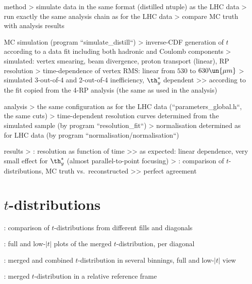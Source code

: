 \> method
\>> simulate data in the same format (distilled ntuple) as the LHC data
\>> run exactly the same analysis chain as for the LHC data
\>> compare MC truth with analysis results

\> MC simulation (program ``simulate\_distill``)
\>> inverse-CDF generation of $t$ according to a data fit including both hadronic and Coulomb components
\>> simulated: vertex smearing, beam divergence, proton transport (linear), RP resolution
\>> time-dependence of vertex RMS: linear from $530$ to $630\un{\mu m}$
\>> simulated 3-out-of-4 and 2-out-of-4 inefficiency, $\th^*_y$ dependent
\>>> according to the fit copied from the 4-RP analysis (the same as used in the analysis)

\> analysis
\>> the same configuration as for the LHC data (``parameters\_global.h``, the same cuts)
\>> time-dependent resolution curves determined from the simulated sample (by program ``resolution\_fit``)
\>> normalisation determined as for LHC data (by program ``normalisation/normalisation``)

\> results
\>>  : resolution as function of time
\>>> as expected: linear dependence, very small effect for $\th_y^*$ (almost parallel-to-point focusing)
\>>  : comparison of $t$-distributions, MC truth vs.\ reconstructed
\>>> perfect agreement



\section[t-distributions]{$t$-distributions}

\>  : comparison of $t$-distributions from different fills and diagonals

\>  : full and low-$|t|$ plots of the merged $t$-distribution, per diagonal

\>  : merged and combined $t$-distribution in several binnings, full and low-$|t|$ view

\>  : merged $t$-distribution in a relative reference frame



